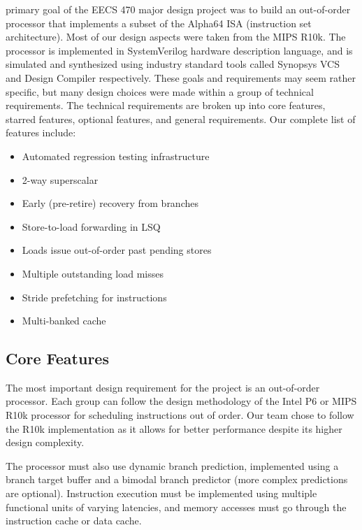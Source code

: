 \documentclass[10pt,journal,compsoc]{IEEEtran}
\begin{document}
 primary goal of the EECS 470 major design project was to build an out-of-order processor that implements a subset of the Alpha64 ISA (instruction set architecture). Most of our design aspects were taken from the MIPS R10k. The processor is implemented in SystemVerilog hardware description language, and is simulated and synthesized using industry standard tools called Synopsys VCS and Design Compiler respectively. These goals and requirements may seem rather specific, but many design choices were made within a group of technical requirements. The technical requirements are broken up into core features, starred features, optional features, and general requirements. Our complete list of features include:
\begin{itemize}
\item Automated regression testing infrastructure
\item 2-way superscalar
\item Early (pre-retire) recovery from branches
\item Store-to-load forwarding in LSQ
\item Loads issue out-of-order past pending stores
\item Multiple outstanding load misses
\item Stride prefetching for instructions
\item Multi-banked cache
\end{itemize}

\subsection{Core Features}
The most important design requirement for the project is an out-of-order processor. Each group can follow the design methodology of the Intel P6 or MIPS R10k processor for scheduling instructions out of order. Our team chose to follow the R10k implementation as it allows for better performance despite its higher design complexity.

The processor must also use dynamic branch prediction, implemented using a branch target buffer and a bimodal branch predictor (more complex predictions are optional). Instruction execution must be implemented using multiple functional units of varying latencies, and memory accesses must go through the instruction cache or data cache.
\end{document}
